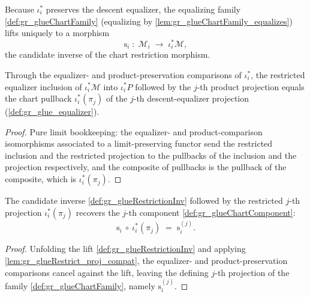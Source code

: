\begin{definition}\leanok
  \label{def:gr_glueRestrictionInv}
  Because \(\iota_i^{*}\) preserves the descent equalizer, the equalizing family
  \cref{def:gr_glueChartFamily} (equalizing by \cref{lem:gr_glueChartFamily_equalizes})
  lifts uniquely to a morphism
  \[
    \mathrm{s}_i \;:\; \mathcal{M}_i \;\longrightarrow\; \iota_i^{*}\mathcal{M},
  \]
  the candidate inverse of the chart restriction morphism.
\end{definition}

\begin{lemma}\leanok
  \label{lem:gr_glueRestrict_proj_compat}
  Through the equalizer- and product-preservation comparisons of \(\iota_i^{*}\), the
  restricted equalizer inclusion of \(\iota_i^{*}\mathcal{M}\) into \(\iota_i^{*}P\)
  followed by the \(j\)-th product projection equals the chart pullback
  \(\iota_i^{*}(\pi_j)\) of the \(j\)-th descent-equalizer projection
  (\cref{def:gr_glue_equalizer}).
\end{lemma}
\begin{proof}
  \leanok
  Pure limit bookkeeping: the equalizer- and product-comparison isomorphisms
  associated to a limit-preserving functor send the restricted inclusion and the
  restricted projection to the pullbacks of the inclusion and the projection
  respectively, and the composite of pullbacks is the pullback of the composite, which
  is \(\iota_i^{*}(\pi_j)\).
\end{proof}

\begin{lemma}\leanok
  \label{lem:gr_glueRestrictionInv_proj}
  The candidate inverse \cref{def:gr_glueRestrictionInv} followed by the restricted
  \(j\)-th projection \(\iota_i^{*}(\pi_j)\) recovers the \(j\)-th component
  \cref{def:gr_glueChartComponent}:
  \[
    \mathrm{s}_i\ \circ\ \iota_i^{*}(\pi_j)
      \;=\; \mathrm{s}_i^{(j)} .
  \]
\end{lemma}
\begin{proof}
  \leanok
  Unfolding the lift \cref{def:gr_glueRestrictionInv} and applying
  \cref{lem:gr_glueRestrict_proj_compat}, the equalizer- and product-preservation
  comparisons cancel against the lift, leaving the defining \(j\)-th projection of the
  family \cref{def:gr_glueChartFamily}, namely \(\mathrm{s}_i^{(j)}\).
\end{proof}

